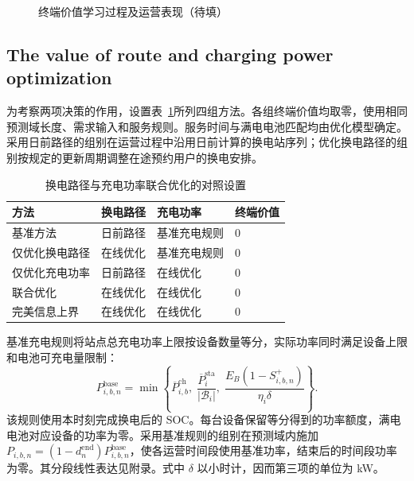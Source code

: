 \begin{figure}[!htbp]
  \centering
  \caption{终端价值学习过程及运营表现（待填）}
  \label{exp:value_figure}
\end{figure}



\FloatBarrier
\subsection{The value of route and charging power optimization}
\label{exp:joint}

为考察两项决策的作用，设置表~\ref{exp:joint_methods}所列四组方法。各组终端价值均取零，使用相同预测域长度、需求输入和服务规则。服务时间与满电电池匹配均由优化模型确定。采用日前路径的组别在运营过程中沿用日前计算的换电站序列；优化换电路径的组别按规定的更新周期调整在途预约用户的换电安排。

\begin{table}[!htbp]
  \centering
  \caption{换电路径与充电功率联合优化的对照设置}
  \label{exp:joint_methods}
  \small
  \begin{tabularx}{\linewidth}{@{}Xlll@{}}
    \toprule
    方法 & 换电路径 & 充电功率 & 终端价值 \\
    \midrule
    基准方法 & 日前路径 & 基准充电规则 & 0 \\
    仅优化换电路径 & 在线优化 & 基准充电规则 & 0 \\
    仅优化充电功率 & 日前路径 & 在线优化 & 0 \\
    联合优化 & 在线优化 & 在线优化 & 0 \\
    完美信息上界 & 在线优化 & 在线优化 & 0 \\
    \bottomrule
  \end{tabularx}
\end{table}

基准充电规则将站点总充电功率上限按设备数量等分，实际功率同时满足设备上限和电池可充电量限制：
\begin{equation}
 P_{i,b,n}^{\mathrm{base}}=
 \min\left\{
 \overline P_{i,b}^{\mathrm{ch}},\;
 \frac{\overline P_i^{\mathrm{sta}}}{|\mathcal B_i|},\;
 \frac{E_B(1-S_{i,b,n}^{+})}{\eta_i\delta}
 \right\}.
 \label{eq:baseline_power}
\end{equation}
该规则使用本时刻完成换电后的 SOC。每台设备保留等分得到的功率额度，满电电池对应设备的功率为零。采用基准规则的组别在预测域内施加 $P_{i,b,n}=(1-d_n^{\mathrm{end}})P_{i,b,n}^{\mathrm{base}}$，使各运营时间段使用基准功率，结束后的时间段功率为零。其分段线性表达见附录。式中 $\delta$ 以小时计，因而第三项的单位为 kW。

